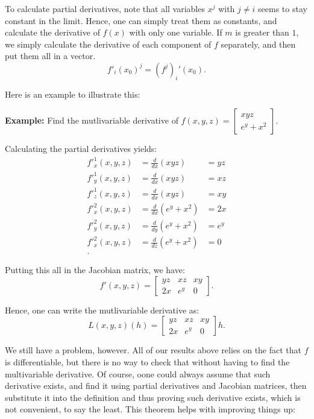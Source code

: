 To calculate partial derivatives, note that all variables \( x^{j} \) with \( j
\neq  i\) seems to stay constant in the limit. Hence, one can simply treat them
as constants, and calculate the derivative of \( f(x) \) with only one variable.
If \( m \) is greater than \( 1 \), we simply calculate the derivative of each
component of \( f \) separately, and then put them all in a vector.
\[
  f'_{i}(x_{0})^{j} = (f^{j})_{i}'(x_{0})
.\] 

Here is an example to illustrate this:

\textbf{Example:} Find the mutlivariable derivative of \( f(x, y, z) =
\begin{bmatrix} xyz \\ e^{y} + x^2 \end{bmatrix}  \).

Calculating the partial derivatives yields:
\begin{align*}
  f'^{1}_{x}(x, y, z) &= \frac{d}{dx}(xyz) &= yz\\
  f'^{1}_{y}(x, y, z) &= \frac{d}{dx}(xyz) &= xz\\
  f'^{1}_{z}(x, y, z) &= \frac{d}{dx}(xyz) &= xy\\
  f'^{2}_{x}(x, y, z) &= \frac{d}{dx}(e^{y}+x^2) &= 2x\\
  f'^{2}_{y}(x, y, z) &= \frac{d}{dy}(e^{y}+x^2) &= e^{y}\\
  f'^{2}_{x}(x, y, z) &= \frac{d}{dz}(e^{y}+x^2) &= 0\\
.\end{align*}

Putting this all in the Jacobian matrix, we have:
\[
  f'(x, y, z) = \begin{bmatrix} yz & xz & xy \\ 2x & e^{y} & 0 \end{bmatrix} 
.\] 

Hence, one can write the mutlivariable derivative as:
\[
  L(x, y, z)(h) = \begin{bmatrix} yz & xz & xy \\ 2x & e^{y} & 0 \end{bmatrix} h
.\] 

We still have a problem, however. All of our results above relies on the fact
that \( f \) is differentiable, but there is no way to check that without having
to find the multivariable derivative. Of course, oone could always assume that
such derivative exists, and find it using partial derivatives and Jacobian
matrices, then substitute it into the definition and thus proving such
derivative exists, which is not convenient, to say the least. This theorem helps
with improving things up:

